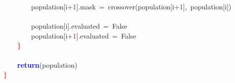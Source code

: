 \mbox{}\ \ \ \ \ \ \ \ population\textcolor{BrickRed}{[}i\textcolor{BrickRed}{+}\textcolor{Purple}{1}\textcolor{BrickRed}{].}mask\ \textcolor{BrickRed}{=}\ crossover\textcolor{BrickRed}{(}population\textcolor{BrickRed}{[}i\textcolor{BrickRed}{+}\textcolor{Purple}{1}\textcolor{BrickRed}{],}\ population\textcolor{BrickRed}{[}i\textcolor{BrickRed}{])} \\
\mbox{} \\
\mbox{}\ \ \ \ \ \ \ \ population\textcolor{BrickRed}{[}i\textcolor{BrickRed}{].}evaluated\ \textcolor{BrickRed}{=}\ False \\
\mbox{}\ \ \ \ \ \ \ \ population\textcolor{BrickRed}{[}i\textcolor{BrickRed}{+}\textcolor{Purple}{1}\textcolor{BrickRed}{].}evaluated\ \textcolor{BrickRed}{=}\ False \\
\mbox{}\ \ \ \ \textcolor{Red}{\}} \\
\mbox{} \\
\mbox{}\ \ \ \ \textbf{\textcolor{Blue}{return}}\textcolor{BrickRed}{(}population\textcolor{BrickRed}{)} \\
\mbox{}\textcolor{Red}{\}} \\
\mbox{}
